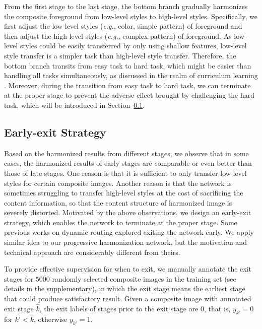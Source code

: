 \documentclass[letterpaper]{article} %
\begin{document}
From the first stage to the last stage, the bottom branch gradually harmonizes the composite foreground from low-level styles to high-level styles. Specifically, we first adjust the low-level styles (\emph{e.g.}, color, simple pattern) of foreground and then adjust the high-level styles (\emph{e.g.}, complex pattern) of foreground. As low-level styles could be easily transferred by only using shallow features, low-level style transfer is a simpler task than high-level style transfer. Therefore, the bottom branch transits from easy task to hard task, which might be easier than handling all tasks simultaneously, as discussed in the realm of curriculum learning \cite{bengio2009curriculum}. Moreover, during the transition from easy task to hard task, we can terminate at the proper stage to prevent the adverse effect brought by challenging the hard task, which will be introduced in Section~\ref{sec:early_exit}.


\subsection {Early-exit Strategy} \label{sec:early_exit}

Based on the harmonized results from different stages, we observe that in some cases, the harmonized results of early stages are comparable or even better than those of late stages. One reason is that it is sufficient to only transfer low-level styles for certain composite images. Another reason is that the network is sometimes struggling to transfer high-level styles at the cost of sacrificing the content information, so that the content structure of harmonized image is severely distorted. Motivated by the above observations, we design an early-exit strategy, which enables the network to terminate at the proper stage. Some previous works \cite{huangmulti,teerapittayanon2016branchynet,bolukbasi2017adaptive,mcgill2017deciding,jie2019anytime,li2019improved,figurnov2017spatially,leroux2018iamnn} on dynamic routing explored  exiting the network early. We apply similar idea to our progressive harmonization network, but the motivation and technical approach are considerably different from theirs.

To provide effective supervision for when to exit, we manually annotate the exit stages for $5000$ randomly selected composite images in the training set (see details in the supplementary), in which the exit stage means the earliest stage that could produce satisfactory result. Given a composite image with annotated exit stage $\hat{k}$, the exit labels of stages prior to the exit stage are $0$, that is, $y_{k'}=0$ for $k'<\hat{k}$,  otherwise $y_{k'}=1$.
\end{document}
